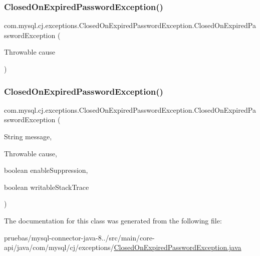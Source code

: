 \subsubsection{\texorpdfstring{Closed\+On\+Expired\+Password\+Exception()}{ClosedOnExpiredPasswordException()}\hspace{0.1cm}{\footnotesize\ttfamily [4/5]}}
{\footnotesize\ttfamily com.\+mysql.\+cj.\+exceptions.\+Closed\+On\+Expired\+Password\+Exception.\+Closed\+On\+Expired\+Password\+Exception (\begin{DoxyParamCaption}\item[{Throwable}]{cause }\end{DoxyParamCaption})}

\mbox{\label{classcom_1_1mysql_1_1cj_1_1exceptions_1_1_closed_on_expired_password_exception_ad6869873ce2abecf34755acfaf6bb19f}} 
\subsubsection{\texorpdfstring{Closed\+On\+Expired\+Password\+Exception()}{ClosedOnExpiredPasswordException()}\hspace{0.1cm}{\footnotesize\ttfamily [5/5]}}
{\footnotesize\ttfamily com.\+mysql.\+cj.\+exceptions.\+Closed\+On\+Expired\+Password\+Exception.\+Closed\+On\+Expired\+Password\+Exception (\begin{DoxyParamCaption}\item[{String}]{message,  }\item[{Throwable}]{cause,  }\item[{boolean}]{enable\+Suppression,  }\item[{boolean}]{writable\+Stack\+Trace }\end{DoxyParamCaption})\hspace{0.3cm}{\ttfamily [protected]}}



The documentation for this class was generated from the following file\+:\begin{DoxyCompactItemize}
\item 
pruebas/mysql-\/connector-\/java-\/8../src/main/core-\/api/java/com/mysql/cj/exceptions/\mbox{\hyperlink{_closed_on_expired_password_exception_8java}{Closed\+On\+Expired\+Password\+Exception.\+java}}\end{DoxyCompactItemize}

